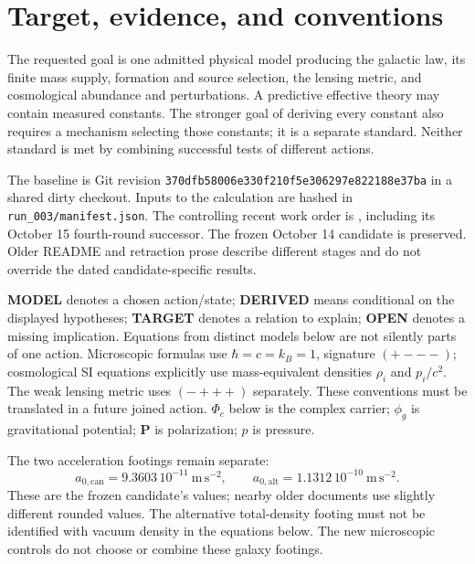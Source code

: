 \documentclass[11pt]{article}
\begin{document}
\section{Target, evidence, and conventions}
The requested goal is one admitted physical model producing the galactic law,
its finite mass supply, formation and source selection, the lensing metric,
and cosmological abundance and perturbations. A predictive effective theory
may contain measured constants. The stronger goal of deriving every constant
also requires a mechanism selecting those constants; it is a separate standard.
Neither standard is met by combining successful tests of different actions.

The baseline is Git revision
\texttt{370dfb58006e330f210f5e306297e822188e37ba} in a shared dirty checkout.
Inputs to the calculation are hashed in \texttt{run\_003/manifest.json}.
The controlling recent work order is
, including its October 15
fourth-round successor. The frozen October 14 candidate is preserved.
Older README and retraction prose describe different stages and do not
override the dated candidate-specific results.

\textbf{MODEL} denotes a chosen action/state; \textbf{DERIVED} means conditional
on the displayed hypotheses; \textbf{TARGET} denotes a relation to explain;
\textbf{OPEN} denotes a missing implication. Equations from distinct models
below are not silently parts of one action. Microscopic formulas use
$\hbar=c=k_B=1$, signature $(+---)$; cosmological SI equations explicitly
use mass-equivalent densities $\rho_i$ and $p_i/c^2$. The weak lensing metric
uses $(-+++)$ separately. These conventions must be translated in a future
joined action. $\Phi_c$ below is the complex carrier; $\phi_g$ is gravitational
potential; $\mathbf P$ is polarization; $p$ is pressure.

The two acceleration footings remain separate:
\begin{equation}
 a_{0,\mathrm{can}}=9.3603\,10^{-11}\ \mathrm{m\,s^{-2}},\qquad
 a_{0,\mathrm{alt}}=1.1312\,10^{-10}\ \mathrm{m\,s^{-2}}.
\end{equation}
These are the frozen candidate's values; nearby older documents use slightly
different rounded values. The alternative total-density footing must not
be identified with vacuum density in the equations below. The new microscopic
controls do not choose or combine these galaxy footings.
\end{document}
